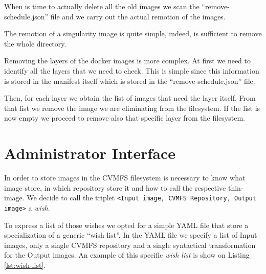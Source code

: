 When is time to actually delete all the old images we scan the
“remove-schedule.json” file and we carry out the actual remotion of the images. 

The remotion of a singularity image is quite simple, indeed, is sufficient to
remove the whole directory.

Removing the layers of the docker images is more complex. At first we need to
identify all the layers that we need to check. This is simple since this
information is stored in the manifest itself which is stored in the
“remove-schedule.json” file.

Then, for each layer we obtain the list of images that need the layer itself.
From that list we remove the image we are eliminating from the filesystem. If
the list is now empty we proceed to remove also that specific layer from the
filesystem.

\section{Administrator Interface}

In order to store images in the CVMFS filesystem is necessary to know what
image store, in which repository store it and how to call the respective
thin-image. We decide to call the triplet \texttt{<Input image, CVMFS
Repository, Output image>} a \textit{wish}.

To express a list of those wishes we opted for a simple YAML file that store a
specialization of a generic “wish list”. In the YAML file we specify a list of
Input images, only a single CVMFS repository and a single syntactical
transformation for the Output images. An example of this specific \textit{wish
list} is show on Listing \ref{lst:wish-list}.

